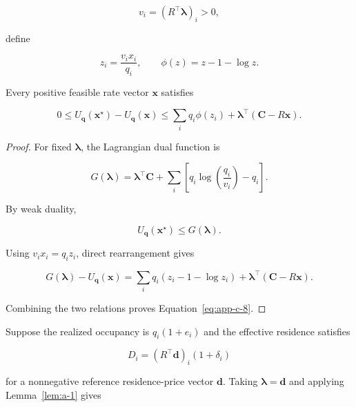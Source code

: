\[
v_i=(R^\top\boldsymbol\lambda)_i>0,
\]

define

\begin{equation}
\label{eq:app-c-7}
z_i=\frac{v_ix_i}{q_i},
\qquad
\phi(z)=z-1-\log z.
\end{equation}

\begin{theorem}
\label{thm:c-1}
Every positive feasible rate vector \(\mathbf x\) satisfies

\begin{equation}
\label{eq:app-c-8}
\boxed{
0\le U_{\mathbf q}(\mathbf x^\star)-U_{\mathbf q}(\mathbf x)
\le
\sum_iq_i\phi(z_i)
+
\boldsymbol\lambda^\top(\mathbf C-R\mathbf x).
}
\end{equation}
\end{theorem}

\begin{proof} For fixed \(\boldsymbol\lambda\), the Lagrangian dual function is

\begin{equation}
\label{eq:app-c-9}
G(\boldsymbol\lambda)
=
\boldsymbol\lambda^\top\mathbf C
+
\sum_i
\left[
q_i\log\left(\frac{q_i}{v_i}\right)-q_i
\right].
\end{equation}

By weak duality,

\[
U_{\mathbf q}(\mathbf x^\star)\le G(\boldsymbol\lambda).
\]

Using \(v_ix_i=q_iz_i\), direct rearrangement gives

\begin{equation}
\label{eq:app-c-10}
G(\boldsymbol\lambda)-U_{\mathbf q}(\mathbf x)
=
\sum_iq_i(z_i-1-\log z_i)
+
\boldsymbol\lambda^\top(\mathbf C-R\mathbf x).
\end{equation}

Combining the two relations proves Equation~\eqref{eq:app-c-8}.
\end{proof}

Suppose the realized occupancy is \(q_i(1+e_i)\) and the effective residence satisfies

\begin{equation}
\label{eq:app-c-11}
D_i=(R^\top\mathbf d)_i(1+\delta_i)
\end{equation}

for a nonnegative reference residence-price vector \(\mathbf d\). Taking \(\boldsymbol\lambda=\mathbf d\) and applying Lemma~\ref{lem:a-1} gives

